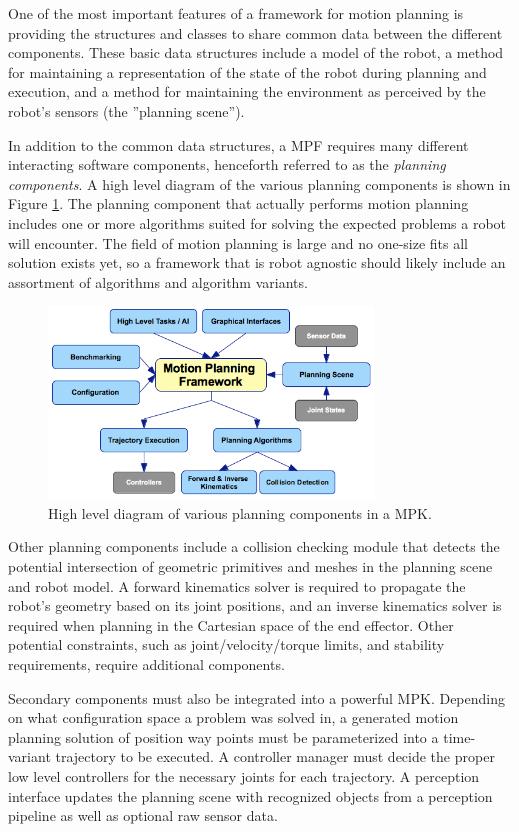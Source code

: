 \documentclass[10pt,journal,compsoc]{joser1}
\begin{document}
{One of the most important features of a framework for motion planning is providing the structures and classes to share common data between the different components. These basic data structures include a model of the robot, a method for maintaining a representation of the state of the robot during planning and execution, and a method for maintaining the environment as perceived by the robot's sensors (the ''planning scene'').

In addition to the common data structures, a MPF requires many different interacting software components, henceforth referred to as the \textit{planning components}. A high level diagram of the various planning components is shown in Figure \ref{fig:motionplanning_highlevel}. The planning component that actually performs motion planning includes one or more algorithms suited for solving the expected problems a robot will encounter. The field of motion planning is large and no one-size fits all solution exists yet, so a framework that is robot agnostic should likely include an assortment of algorithms and algorithm variants.

\begin{figure}[!t]
\centering
\includegraphics[width=3.4in]{images/motionplanning_highlevel}
\caption{High level diagram of various planning components in a MPK.}
\label{fig:motionplanning_highlevel}
\end{figure} 

Other planning components include a collision checking module that detects the potential intersection of geometric primitives and meshes in the planning scene and robot model. A forward kinematics solver is required to propagate the robot's geometry based on its joint positions, and an inverse kinematics solver is required when planning in the Cartesian space of the end effector. Other potential constraints, such as joint/velocity/torque limits, and stability requirements, require additional components.

Secondary components must also be integrated into a powerful MPK. Depending on what configuration space a problem was solved in, a generated motion planning solution of position way points must be parameterized into a time-variant trajectory to be executed. A controller manager must decide the proper low level controllers for the necessary joints for each trajectory. A perception interface updates the planning scene with recognized objects from a perception pipeline as well as optional raw sensor data.

}
\end{document}
